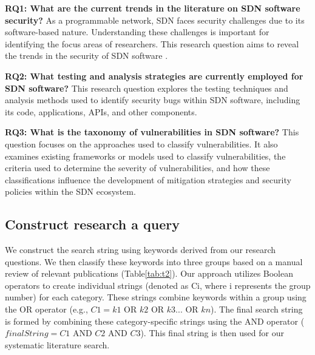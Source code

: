 \begin{list}{}{}
\item \textbf{RQ1: What are the current trends in the literature on SDN software security?} As a programmable network, SDN faces security challenges due to its software-based nature. Understanding these challenges is important for identifying the focus areas of researchers. This research question aims to reveal the trends in the security of SDN software .
\item\textbf{RQ2: What testing and analysis strategies are currently employed for SDN software?} This research question explores the testing techniques and analysis methods used to identify security bugs within SDN software, including its code, applications, APIs, and other components. 

\item\textbf{RQ3: What is the taxonomy of vulnerabilities in SDN software?} This question focuses on the approaches used to classify vulnerabilities. It also examines existing frameworks or models used to classify vulnerabilities, the criteria used to determine the severity of vulnerabilities, and how these classifications influence the development of mitigation strategies and security policies within the SDN ecosystem.
\end{list}


\subsection{Construct research a query}
We construct the search string using keywords derived from our research questions. We then classify these keywords into three groups based on a manual review of relevant publications (Table\ref{tab:t2}).
Our approach utilizes Boolean operators to create individual strings (denoted as Ci, where i represents the group number) for each category. These strings combine keywords within a group using the OR operator (e.g., $C1 = k1$ OR $k2$ OR $k3 ...$ OR $kn$). The final search string is formed by combining these category-specific strings using the AND operator ($finalString = C1$ AND $C2$ AND $C3$). This final string is then used for our systematic literature search.

